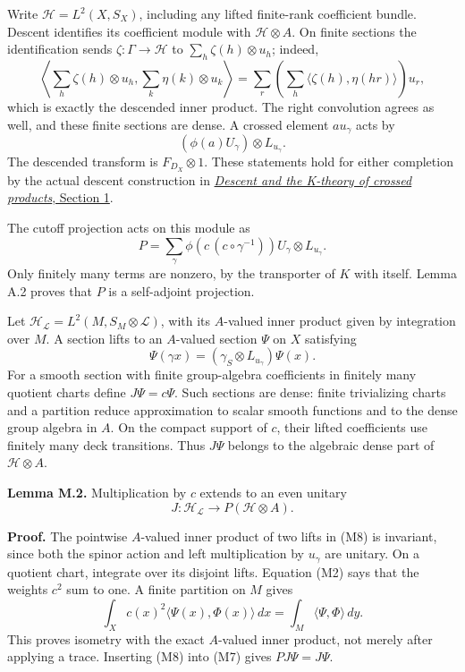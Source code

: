 \documentclass[
  11pt,
]{article}
\begin{document}
Write \(\mathcal H=L^2(X,S_X)\), including any lifted finite-rank
coefficient bundle. Descent identifies its coefficient module with
\(\mathcal H\otimes A\). On finite sections the identification sends
\(\zeta:\Gamma\to\mathcal H\) to \(\sum_h\zeta(h)\otimes u_h\); indeed,
\[
\left\langle\sum_h\zeta(h)\otimes u_h,
                  \sum_k\eta(k)\otimes u_k\right\rangle
=\sum_r\left(\sum_h\langle\zeta(h),\eta(hr)\rangle\right)u_r,
\tag{M5}
\] which is exactly the descended inner product. The right convolution
agrees as well, and these finite sections are dense. A crossed element
\(a u_\gamma\) acts by \[
(\phi(a)U_\gamma)\otimes L_{u_\gamma}.
\tag{M6}
\] The descended transform is \(F_{D_X}\otimes1\). These statements hold
for either completion by the actual descent construction in
\href{KT-KK-18.html\#1-crossing-a-hilbert-module}{\emph{Descent and the
K-theory of crossed products}, Section 1}.

The cutoff projection acts on this module as \[
P=\sum_\gamma
 \phi\!\left(c\,(c\circ\gamma^{-1})\right)
                U_\gamma\otimes L_{u_\gamma}.
\tag{M7}
\] Only finitely many terms are nonzero, by the transporter of \(K\)
with itself. Lemma A.2 proves that \(P\) is a self-adjoint projection.

Let \(\mathcal H_{\mathcal L}=L^2(M,S_M\otimes\mathcal L)\), with its
\(A\)-valued inner product given by integration over \(M\). A section
lifts to an \(A\)-valued section \(\Psi\) on \(X\) satisfying \[
\Psi(\gamma x)=(\gamma_S\otimes L_{u_\gamma})\Psi(x).
\tag{M8}
\] For a smooth section with finite group-algebra coefficients in
finitely many quotient charts define \(J\Psi=c\Psi\). Such sections are
dense: finite trivializing charts and a partition reduce approximation
to scalar smooth functions and to the dense group algebra in \(A\). On
the compact support of \(c\), their lifted coefficients use finitely
many deck transitions. Thus \(J\Psi\) belongs to the algebraic dense
part of \(\mathcal H\otimes A\).

\textbf{Lemma M.2.} Multiplication by \(c\) extends to an even unitary
\[
J:\mathcal H_{\mathcal L}\longrightarrow P(\mathcal H\otimes A).
\tag{M9}
\]

\textbf{Proof.} The pointwise \(A\)-valued inner product of two lifts in
(M8) is invariant, since both the spinor action and left multiplication
by \(u_\gamma\) are unitary. On a quotient chart, integrate over its
disjoint lifts. Equation (M2) says that the weights \(c^2\) sum to one.
A finite partition on \(M\) gives \[
\int_X c(x)^2\langle\Psi(x),\Phi(x)\rangle\,dx
 =\int_M\langle\Psi,\Phi\rangle\,dy.
\tag{M10}
\] This proves isometry with the exact \(A\)-valued inner product, not
merely after applying a trace. Inserting (M8) into (M7) gives
\(PJ\Psi=J\Psi\).
\end{document}
